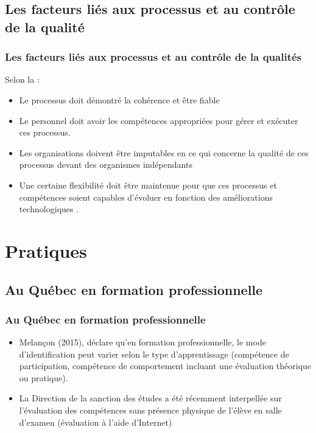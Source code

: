 \documentclass[aspectratio=169]{beamer}
\begin{document}
			\subsection{Les facteurs liés aux processus et au contrôle de la qualité \citep{authority2014a}} 
			\begin{frame}
			 	\frametitle{Les facteurs liés aux processus et au contrôle de la qualités}
				Selon la \citet{authority2014a} :
				\begin {itemize}
					\item Le processus doit démontré la cohérence et être fiable
					\item Le personnel doit avoir les compétences appropriées pour gérer et exécuter ces processus.
					\item Les organisations doivent être imputables en ce qui concerne la qualité de ces processus devant des organismes indépendants
					\item Une certaine flexibilité doit être maintenue pour que ces processus et compétences soient capables d'évoluer en fonction des améliorations technologiques .
					
				\end{itemize}
			\end{frame}
			
			
	\section{Pratiques} 
			
		\subsection{Au Québec en formation professionnelle} 
			\begin{frame}
				  \frametitle{Au Québec en formation professionnelle}
				  \begin {itemize}
					\item Melançon (2015), déclare qu'en formation professionnelle, le mode d’identification peut varier selon le type d’apprentissage (compétence de participation, compétence de comportement incluant une évaluation théorique ou pratique). 
					\item La Direction de la sanction des études a été récemment interpellée sur l’évaluation des compétences sans présence physique de l’élève en salle d’examen (évaluation à l’aide d’Internet)
				\end{itemize}
			\end{frame}
			
\end{document}
